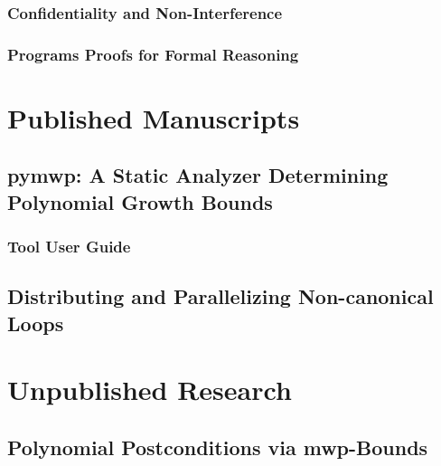     \subsection{Confidentiality and Non-Interference}
    \label{pl-sec}
    

    \subsection{Programs Proofs for Formal Reasoning}
    \label{verification}
    

\chapter{Published Manuscripts}\label{published-manuscripts}
\clearpage

    \section{pymwp: A Static Analyzer Determining Polynomial Growth Bounds}
    \label{sec:atva}
    
    \clearpage

    \subsection{Tool User Guide}
    \label{sec:toolguide}
    
    \clearpage

    \section{Distributing and Parallelizing Non-canonical Loops}
    \label{sec:vmcai}
    
    \clearpage

\chapter{Unpublished Research}\label{ch:unpublished-research}
\clearpage

    \section{Polynomial Postconditions via mwp-Bounds}\label{sec:postcond}
    
    \clearpage

